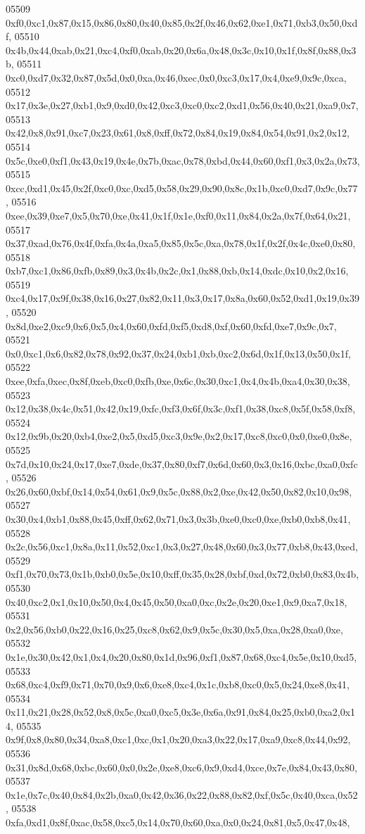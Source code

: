 \begin{DoxyCode}
05509   0xf0,0xc1,0x87,0x15,0x86,0x80,0x40,0x85,0x2f,0x46,0x62,0xe1,0x71,0xb3,0x50,0xdf,
05510   0x4b,0x44,0xab,0x21,0xc4,0xf0,0xab,0x20,0x6a,0x48,0x3c,0x10,0x1f,0x8f,0x88,0x3b,
05511   0xc0,0xd7,0x32,0x87,0x5d,0x0,0xa,0x46,0xec,0x0,0xc3,0x17,0x4,0xe9,0x9c,0xca,
05512   0x17,0x3e,0x27,0xb1,0x9,0xd0,0x42,0xc3,0xc0,0xc2,0xd1,0x56,0x40,0x21,0xa9,0x7,
05513   0x42,0x8,0x91,0xc7,0x23,0x61,0x8,0xff,0x72,0x84,0x19,0x84,0x54,0x91,0x2,0x12,
05514   0x5c,0xe0,0xf1,0x43,0x19,0x4e,0x7b,0xac,0x78,0xbd,0x44,0x60,0xf1,0x3,0x2a,0x73,
05515   0xcc,0xd1,0x45,0x2f,0xc0,0xc,0xd5,0x58,0x29,0x90,0x8c,0x1b,0xc0,0xd7,0x9c,0x77,
05516   0xee,0x39,0xe7,0x5,0x70,0xe,0x41,0x1f,0x1e,0xf0,0x11,0x84,0x2a,0x7f,0x64,0x21,
05517   0x37,0xad,0x76,0x4f,0xfa,0x4a,0xa5,0x85,0x5c,0xa,0x78,0x1f,0x2f,0x4c,0xe0,0x80,
05518   0xb7,0xc1,0x86,0xfb,0x89,0x3,0x4b,0x2c,0x1,0x88,0xb,0x14,0xdc,0x10,0x2,0x16,
05519   0xc4,0x17,0x9f,0x38,0x16,0x27,0x82,0x11,0x3,0x17,0x8a,0x60,0x52,0xd1,0x19,0x39,
05520   0x8d,0xe2,0xc9,0x6,0x5,0x4,0x60,0xfd,0xf5,0xd8,0xf,0x60,0xfd,0xe7,0x9c,0x7,
05521   0x0,0xc1,0x6,0x82,0x78,0x92,0x37,0x24,0xb1,0xb,0xc2,0x6d,0x1f,0x13,0x50,0x1f,
05522   0xee,0xfa,0xec,0x8f,0xeb,0xc0,0xfb,0xe,0x6c,0x30,0xc1,0x4,0x4b,0xa4,0x30,0x38,
05523   0x12,0x38,0x4c,0x51,0x42,0x19,0xfc,0xf3,0x6f,0x3c,0xf1,0x38,0xc8,0x5f,0x58,0xf8,
05524   0x12,0x9b,0x20,0xb4,0xe2,0x5,0xd5,0xc3,0x9e,0x2,0x17,0xc8,0xc0,0x0,0xe0,0x8e,
05525   0x7d,0x10,0x24,0x17,0xe7,0xde,0x37,0x80,0xf7,0x6d,0x60,0x3,0x16,0xbc,0xa0,0xfc,
05526   0x26,0x60,0xbf,0x14,0x54,0x61,0x9,0x5c,0x88,0x2,0xe,0x42,0x50,0x82,0x10,0x98,
05527   0x30,0x4,0xb1,0x88,0x45,0xff,0x62,0x71,0x3,0x3b,0xe0,0xc0,0xe,0xb0,0xb8,0x41,
05528   0x2c,0x56,0xc1,0x8a,0x11,0x52,0xc1,0x3,0x27,0x48,0x60,0x3,0x77,0xb8,0x43,0xed,
05529   0xf1,0x70,0x73,0x1b,0xb0,0x5e,0x10,0xff,0x35,0x28,0xbf,0xd,0x72,0xb0,0x83,0x4b,
05530   0x40,0xc2,0x1,0x10,0x50,0x4,0x45,0x50,0xa0,0xc,0x2e,0x20,0xe1,0x9,0xa7,0x18,
05531   0x2,0x56,0xb0,0x22,0x16,0x25,0xc8,0x62,0x9,0x5c,0x30,0x5,0xa,0x28,0xa0,0xe,
05532   0x1e,0x30,0x42,0x1,0x4,0x20,0x80,0x1d,0x96,0xf1,0x87,0x68,0xc4,0x5e,0x10,0xd5,
05533   0x68,0xc4,0xf9,0x71,0x70,0x9,0x6,0xe8,0xc4,0x1c,0xb8,0xc0,0x5,0x24,0xe8,0x41,
05534   0x11,0x21,0x28,0x52,0x8,0x5c,0xa0,0xc5,0x3e,0x6a,0x91,0x84,0x25,0xb0,0xa2,0x14,
05535   0x9f,0x8,0x80,0x34,0xa8,0xc1,0xc,0x1,0x20,0xa3,0x22,0x17,0xa9,0xc8,0x44,0x92,
05536   0x31,0x8d,0x68,0xbc,0x60,0x0,0x2e,0xe8,0xc6,0x9,0xd4,0xce,0x7e,0x84,0x43,0x80,
05537   0x1e,0x7c,0x40,0x84,0x2b,0xa0,0x42,0x36,0x22,0x88,0x82,0xf,0x5c,0x40,0xca,0x52,
05538   0xfa,0xd1,0x8f,0xac,0x58,0xc5,0x14,0x70,0x60,0xa,0x0,0x24,0x81,0x5,0x47,0x48,

\end{DoxyCode}

